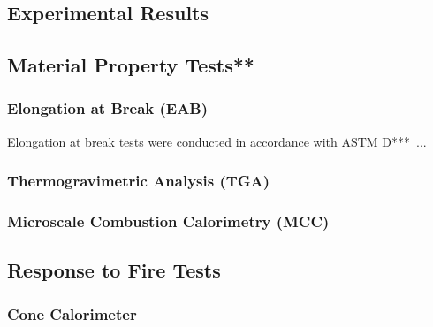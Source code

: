 \subsection{Experimental Results}
\label{sec:results}

\subsection{Material Property Tests**}
\subsubsection{Elongation at Break (EAB)}

Elongation at break tests were conducted in accordance with ASTM D***~\cite{}...
\subsubsection{Thermogravimetric Analysis (TGA)}
\subsubsection{Microscale Combustion Calorimetry (MCC)}



\subsection{Response to Fire Tests}
\subsubsection{Cone Calorimeter}
